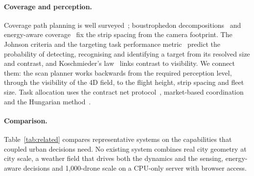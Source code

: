 \paragraph{Coverage and perception.} Coverage path planning is well
surveyed~\cite{galceran2013survey,cabreira2019survey}; boustrophedon decompositions~\cite{choset2000coverage,coombes2017boustrophedon}
and energy-aware coverage~\cite{difranco2016coverage} fix the strip spacing from the camera footprint. The Johnson
criteria and the targeting task performance metric~\cite{sjaardema2015history,vollmerhausen2004new} predict the
probability of detecting, recognising and identifying a target from its resolved size and contrast, and Koschmieder's
law~\cite{horvath1971koschmieder} links contrast to visibility. We connect them: the scan planner works backwards from
the required perception level, through the visibility of the 4D field, to the flight height, strip spacing and fleet
size. Task allocation uses the contract net protocol~\cite{smith1980contract}, market-based
coordination~\cite{dias2006market,choi2009consensus} and the Hungarian method~\cite{kuhn1955hungarian}.

\paragraph{Comparison.} Table~\ref{tab:related} compares representative systems on the capabilities that coupled
urban decisions need. No existing system combines real city geometry at city scale, a weather field that drives both
the dynamics and the sensing, energy-aware decisions and 1,000-drone scale on a CPU-only server with browser access.


